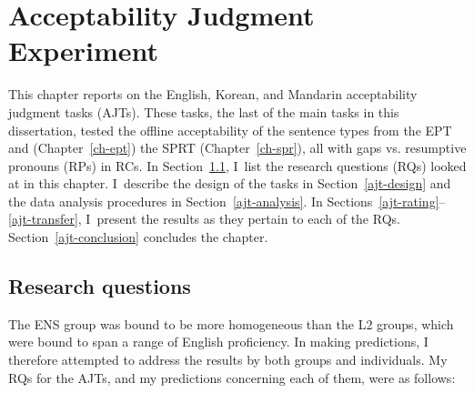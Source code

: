 
\chapter{Acceptability Judgment Experiment}\label{ch-ajt}


This chapter reports on the English, Korean, and Mandarin acceptability judgment tasks (AJTs). These tasks, the last of the main tasks in this dissertation, tested the offline acceptability of the sentence types from the EPT and (Chapter~\ref{ch-ept}) the SPRT (Chapter~\ref{ch-spr}), all with gaps vs. resumptive pronouns (RPs) in RCs. In Section~\ref{ajt-rq}, I~list the research questions (RQs) looked at in this chapter. I~describe the design of the tasks in Section~\ref{ajt-design} and the data analysis procedures in Section~\ref{ajt-analysis}. In Sections~\ref{ajt-rating}--\ref{ajt-transfer}, I~present the results as they pertain to each of the RQs. Section~\ref{ajt-conclusion} concludes the chapter.

\section{Research questions}\label{ajt-rq}

The ENS group was bound to be more homogeneous than the L2 groups, which were bound to span a range of English proficiency. In making predictions, I therefore attempted to address the results by both groups and individuals. My RQs for the AJTs, and my predictions concerning each of them, were as follows:

